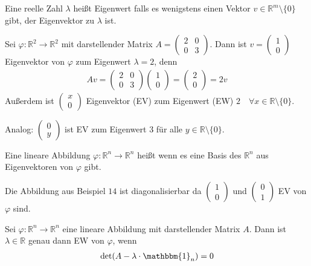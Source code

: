 Eine reelle Zahl $\lambda$ heißt Eigenwert falls es wenigstens einen Vektor $v \in \mathbb{R}^m \setminus \{0\}$ gibt, der Eigenvektor zu $\lambda$ ist.

Sei $\varphi : \mathbb{R}^2 \rightarrow \mathbb{R}^2$ mit darstellender Matrix $A = \begin{pmatrix} 2 & 0 \\ 0 & 3 \end{pmatrix}$. Dann ist $v = \begin{pmatrix}1\\0\end{pmatrix}$ Eigenvektor von $\varphi$ zum Eigenwert $\lambda = 2$, denn
\begin{align*}
	Av = \begin{pmatrix}2 & 0 \\ 0 & 3\end{pmatrix}\begin{pmatrix}1\\0\end{pmatrix} = \begin{pmatrix}2\\0\end{pmatrix} = 2v
\end{align*}
Außerdem ist $\begin{pmatrix}x\\0\end{pmatrix}$ Eigenvektor (EV) zum Eigenwert (EW) $2 \quad\forall x \in \mathbb{R} \setminus \{0\}$.

Analog: $\begin{pmatrix}0\\y\end{pmatrix}$ ist EV zum Eigenwert $3$ für alle $y \in \mathbb{R} \setminus \{0\}$.

Eine lineare Abbildung $\varphi : \mathbb{R}^n \rightarrow \mathbb{R}^n$ heißt  wenn es eine Basis des $\mathbb{R}^n$ aus Eigenvektoren von $\varphi$ gibt.

Die Abbildung aus Beispiel $14$ ist diagonalisierbar da $\begin{pmatrix}1\\0\end{pmatrix}$ und $\begin{pmatrix}0\\1\end{pmatrix}$ EV von $\varphi$ sind.

Sei $\varphi : \mathbb{R}^n \rightarrow \mathbb{R}^n$ eine lineare Abbildung mit darstellender Matrix $A$. Dann ist $\lambda \in \mathbb{R}$ genau dann EW von $\varphi$, wenn
\begin{align*}
	\text{det}(A - \lambda \cdot \mathbbm{1}_n) = 0
\end{align*}

